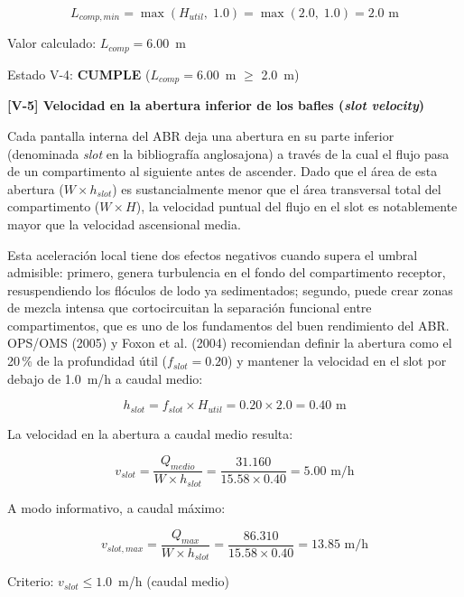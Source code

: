 \documentclass[12pt,a4paper]{article}
\begin{document}
\begin{equation}
L_{comp,min} = \max\!\left(H_{util},\; 1.0\right) = \max\!\left(2.0,\; 1.0\right) = 2.0 \text{ m}
\end{equation}

Valor calculado: $L_{comp} = 6.00$~m

Estado V-4: \textbf{CUMPLE} ($L_{comp} = 6.00$~m $\geq$ 2.0~m)

\textbf{[V-5] Velocidad en la abertura inferior de los bafles (\textit{slot velocity})}

Cada pantalla interna del ABR deja una abertura en su parte inferior (denominada \textit{slot} en la bibliografía anglosajona) a través de la cual el flujo pasa de un compartimento al siguiente antes de ascender. Dado que el área de esta abertura ($W \times h_{slot}$) es sustancialmente menor que el área transversal total del compartimento ($W \times H$), la velocidad puntual del flujo en el slot es notablemente mayor que la velocidad ascensional media.

Esta aceleración local tiene dos efectos negativos cuando supera el umbral admisible: primero, genera turbulencia en el fondo del compartimento receptor, resuspendiendo los flóculos de lodo ya sedimentados; segundo, puede crear zonas de mezcla intensa que cortocircuitan la separación funcional entre compartimentos, que es uno de los fundamentos del buen rendimiento del ABR. OPS/OMS (2005) y Foxon et al. (2004) recomiendan definir la abertura como el 20\,\% de la profundidad útil ($f_{slot} = 0.20$) y mantener la velocidad en el slot por debajo de 1.0~m/h a caudal medio:

\begin{equation}
h_{slot} = f_{slot} \times H_{util} = 0.20 \times 2.0 = 0.40 \text{ m}
\end{equation}

La velocidad en la abertura a caudal medio resulta:

\begin{equation}
v_{slot} = \frac{Q_{medio}}{W \times h_{slot}} = \frac{31.160}{15.58 \times 0.40} = 5.00 \text{ m/h}
\end{equation}

A modo informativo, a caudal máximo:

\begin{equation}
v_{slot,max} = \frac{Q_{max}}{W \times h_{slot}} = \frac{86.310}{15.58 \times 0.40} = 13.85 \text{ m/h}
\end{equation}

Criterio: $v_{slot} \leq 1.0$~m/h (caudal medio)
\end{document}
